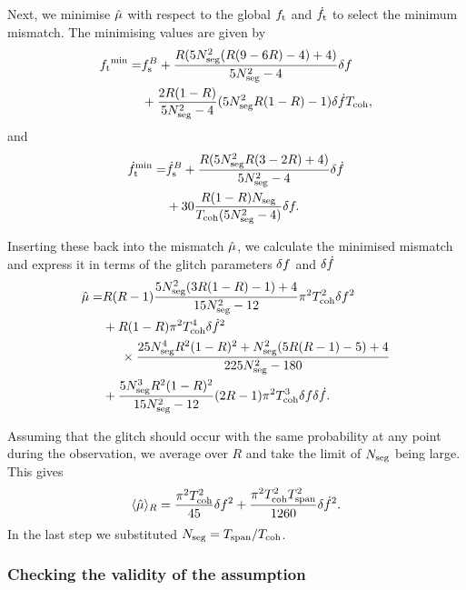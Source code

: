 \documentclass[../full_thesis/full_thesis.tex]{subfiles}
\begin{document}
Next, we minimise $\hat{\mu}$ with respect to the global ${f_{\textrm{t}}}$ and $\dot{f}_{\textrm{t}}$ to
select the minimum mismatch. The minimising values are given by
\begin{align}
\begin{split}
{f_{\textrm{t}}}^{\textrm{min}}  = & f_{\textrm{s}}^{B}
+ \frac{R(5N_{\textrm{seg}}^{2}(R(9-6R)-4) + 4)}{5N_{\textrm{seg}}^{2}-4}\delta f \\
& + \frac{2R(1-R)}{5N_{\textrm{seg}}^{2}-4}(5N_{\textrm{seg}}^{2}R(1-R)-1)\delta\dot{f}T_{\mathrm{coh}},
\end{split}
\end{align}
and
\begin{align}
\begin{split}
\dot{f}_{\textrm{t}}^{\textrm{min}} = & \dot{f}_{\textrm{s}}^{B}
+ \frac{R(5N_{\textrm{seg}}^{2}R(3-2R)+ 4)}{5N_{\textrm{seg}}^{2}-4}\delta\dot{f} \\
& + 30\frac{R(1-R)N_{\textrm{seg}}}{T_{\mathrm{coh}}(5N_{\textrm{seg}}^{2} - 4)}\delta f.
\end{split}
\end{align}

Inserting these back into the mismatch $\hat{\mu}$, we calculate the minimised
mismatch and express it in terms of the glitch parameters $\delta f$ and
$\delta\dot{f}$
\begin{align}
\begin{split}
\hat{\mu} = & R(R-1)\frac{5N_{\textrm{seg}}^{2}(3R(1-R)-1) + 4}{15N_{\textrm{seg}}^{2}-12}\pi^{2}
            T_{\mathrm{coh}}^{2}\delta f^{2} \\
& + R(1-R)\pi^{2}T_{\mathrm{coh}}^{4}\delta\dot{f}^{2} \\
& \hspace{5mm}\times\frac{25N_{\textrm{seg}}^{4}R^{2}(1-R)^{2} + N_{\textrm{seg}}^{2}(5R(R-1)-5) + 4}{225N_{\textrm{seg}}^{2}-180} \\
& + \frac{5N_{\textrm{seg}}^{3}R^{2}(1-R)^{2}}{15N_{\textrm{seg}}^{2}-12}(2R-1)
   \pi^{2}T_{\mathrm{coh}}^{3}\delta f\delta\dot{f}.
\end{split}
\label{eqn: mu semi-coherent R}
\end{align}

Assuming that the glitch should occur with the same probability at any point
during the observation, we average over $R$ and take the limit of $N_{\textrm{seg}}$ being
large. This gives
\begin{align}
\langle\hat{\mu}\rangle_{R} = \frac{\pi^{2}T_{\mathrm{coh}}^{2}}{45}\delta f^{2}
      + \frac{\pi^{2}T_{\mathrm{coh}}^{2}T_{\mathrm{span}}^{2}}{1260}\delta\dot{f}^{2}.
\label{eqn: R-averaged semi-coherent}
\end{align}
In the last step we substituted $N_{\textrm{seg}}=T_{\mathrm{span}}/T_{\mathrm{coh}}$.

\subsubsection{Checking the validity of the assumption}
\end{document}
